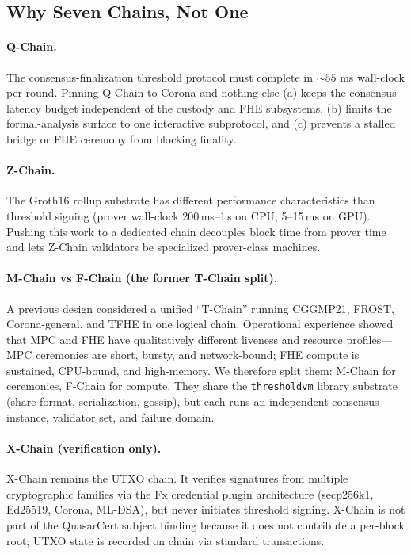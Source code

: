 \subsection{Why Seven Chains, Not One}

\paragraph{Q-Chain.}
The consensus-finalization threshold protocol must complete in
${\sim}55$ ms wall-clock per round. Pinning Q-Chain to Corona and
nothing else (a) keeps the consensus latency budget independent of the
custody and FHE subsystems, (b) limits the formal-analysis surface to
one interactive subprotocol, and (c) prevents a stalled bridge or FHE
ceremony from blocking finality.

\paragraph{Z-Chain.}
The Groth16 rollup substrate has different performance characteristics
than threshold signing (prover wall-clock 200\,ms--1\,s on CPU; 5--15\,ms
on GPU). Pushing this work to a dedicated chain decouples block time
from prover time and lets Z-Chain validators be specialized
prover-class machines.

\paragraph{M-Chain vs F-Chain (the former T-Chain split).}
A previous design considered a unified ``T-Chain'' running CGGMP21,
FROST, Corona-general, and TFHE in one logical chain. Operational
experience showed that MPC and FHE have qualitatively different liveness
and resource profiles---MPC ceremonies are short, bursty, and
network-bound; FHE compute is sustained, CPU-bound, and high-memory. We
therefore split them: M-Chain for ceremonies, F-Chain for compute. They
share the \texttt{thresholdvm} library substrate (share format,
serialization, gossip), but each runs an independent consensus instance,
validator set, and failure domain.

\paragraph{X-Chain (verification only).}
X-Chain remains the UTXO chain. It verifies signatures from
multiple cryptographic families via the Fx credential plugin
architecture (secp256k1, Ed25519, Corona, ML-DSA), but never initiates
threshold signing. X-Chain is not part of the QuasarCert subject
binding because it does not contribute a per-block root; UTXO state is
recorded on chain via standard transactions.

